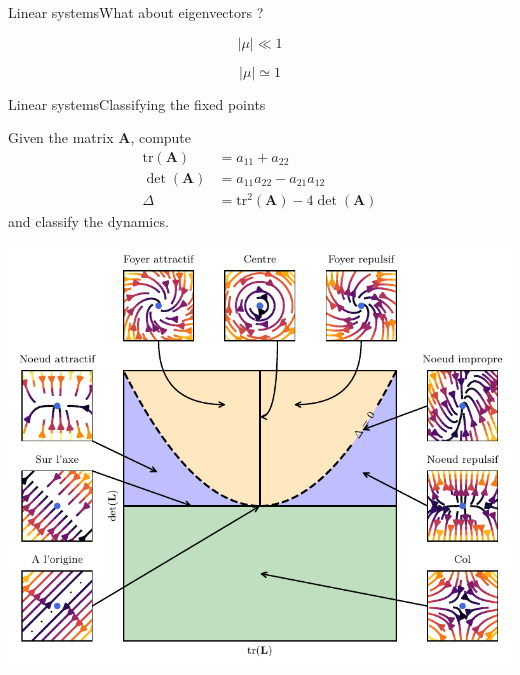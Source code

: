 \documentclass[usenames,dvipsnames,svgnames,10pt,aspectratio=169]{beamer}
\begin{document}
\begin{frame}[t, c]{Linear systems}{What about eigenvectors ?}
\begin{minipage}{.38\textwidth}
\begin{overprint}

      $$\vert \mu \vert \ll 1$$


      \centering

      $$\vert \mu \vert \simeq 1$$

    \end{overprint}
  \end{minipage}
    
  \vspace{1cm}
\end{frame}

\begin{frame}[t, c]{Linear systems}{Classifying the fixed points}
  \begin{minipage}{.28\textwidth}
    Given the matrix $\bm{A}$, compute
    \[
    \begin{aligned}
      \text{tr}(\bm{A}) & = a_{11} + a_{22} \\
      \det(\bm{A}) & = a_{11}a_{22} - a_{21}a_{12} \\
      \Delta & = \text{tr}^2(\bm{A}) - 4 \det(\bm{A})
    \end{aligned}
    \]
    and classify the dynamics.
  \end{minipage}%
  \hfill
  \begin{minipage}{.68\textwidth}
    \centering
    \includegraphics[height=0.8\textheight]{fixed_points_classification}
  \end{minipage}
\end{frame}
\end{document}
